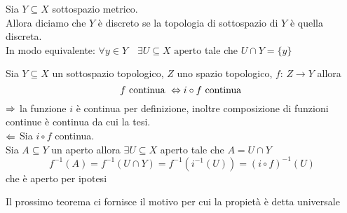 \spazio
\begin{defn}Sia $Y\subseteq X$ sottospazio metrico.\\
Allora diciamo che $Y$ \`e discreto se la topologia di sottospazio di $Y$ \`e quella discreta.\\
In modo equivalente: $\forall y \in Y \quad \exists U \subseteq X \text{ aperto}$ tale che $U\cap Y =\{y\}$
\end{defn}
\spazio
\begin{prop}\bianco
Sia $Y\subseteq X$ un sottospazio topologico, $Z$ uno spazio topologico, $f:\, Z \to Y$ allora
$$ f\text{ continua } \Leftrightarrow i \circ f \text{ continua } $$
\proof $\Rightarrow$  la funzione $i$ \`e continua per definizione, inoltre composizione di funzioni continue \`e continua da cui la tesi.\\
$\Leftarrow$ Sia $i\circ f$ continua.\\
Sia $A\subseteq Y$ un aperto allora $\exists U \subseteq X $ aperto tale che $A=U \cap Y$
$$ f^{-1}(A)=f^{-1}(U \cap Y)= f^{-1}(i^{-1}(U)) = (i \circ f)^{-1}(U)$$ che \`e aperto per ipotesi
\endproof
\end{prop}
Il prossimo teorema ci fornisce il motivo per cui la propiet\`a \`e detta universale
